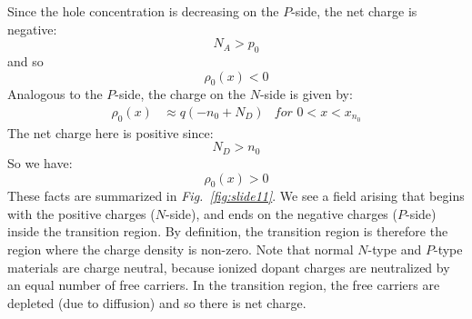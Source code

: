 Since the hole concentration is decreasing on the $P$-side, the net charge is negative:
    \begin{equation} 
        {N_A} > {p_0} 
    \end{equation}
and so
    \begin{equation}
        {\rho _0}(x) < 0 
    \end{equation}
Analogous to the $P$-side, the charge on the $N$-side is given by:
    \begin{align} 
        \rho _0(x) &\approx q(-n_0 + N_D) &\textit{for $0 < x < x_{n_0}$} 
    \end{align}
The net charge here is positive since:
    \begin{equation} 
        N_D > n_0 
    \end{equation}
So we have:
    \begin{equation} 
        \rho _0(x) > 0 
    \end{equation}
These facts are summarized in \emph{Fig.~\ref{fig:slide11}}.  We see a field arising that begins with the positive charges ($N$-side), and ends on the negative charges ($P$-side) inside the transition region.  By definition, the transition region is therefore the region where the charge density is non-zero.  Note that normal $N$-type and $P$-type materials are charge neutral, because ionized dopant charges are neutralized by an equal number of free carriers.  In the transition region, the free carriers are depleted (due to diffusion) and so there is net charge.   
